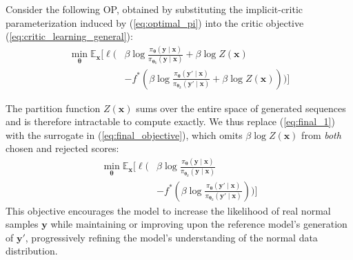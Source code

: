 \begin{proposition} \label{prop:surrogate}
Consider the following OP, obtained by substituting the implicit-critic parameterization induced by (\ref{eq:optimal_pi}) into the critic objective (\ref{eq:critic_learning_general}):
\begin{equation}
\label{eq:final_1}
\begin{split}
\min_{\boldsymbol{\theta}} \mathbb{E}_{\boldsymbol{x}} \Bigg[ \ell \Bigg( & \beta\log\frac{\pi_{\boldsymbol{\theta}}(\boldsymbol{y}\mid \boldsymbol{x})}{\pi_{\boldsymbol{\theta}_{k}}(\boldsymbol{y}\mid \boldsymbol{x})} + \beta \log Z(\boldsymbol{x}) \\
& - f^{*}\left( \beta\log\frac{\pi_{\boldsymbol{\theta}}(\boldsymbol{y}'\mid \boldsymbol{x})}{\pi_{\boldsymbol{\theta}_{k}}(\boldsymbol{y}'\mid \boldsymbol{x})} + \beta \log Z(\boldsymbol{x}) \right) \Bigg) \Bigg]
\end{split}
\end{equation}
\end{proposition}

The partition function $Z(\boldsymbol{x})$ sums over the entire space of generated sequences and is therefore intractable to compute exactly. We thus replace (\ref{eq:final_1}) with the surrogate in (\ref{eq:final_objective}), which omits $\beta\log Z(\boldsymbol{x})$ from \emph{both} chosen and rejected scores:
\begin{equation}
\label{eq:final_objective}
\begin{split}
\min_{\boldsymbol{\theta}} \mathbb{E}_{\boldsymbol{x}}  \Bigg[ \ell \Bigg( &\beta\log\frac{\pi_{\boldsymbol{\theta}}(\boldsymbol{y}\mid \boldsymbol{x})}{\pi_{\boldsymbol{\theta}_{k}}(\boldsymbol{y}\mid \boldsymbol{x})} \\
& - f^{*}\left( \beta\log\frac{\pi_{\boldsymbol{\theta}}(\boldsymbol{y}'\mid \boldsymbol{x})}{\pi_{\boldsymbol{\theta}_{k}}(\boldsymbol{y}'\mid \boldsymbol{x})} \right) \Bigg) \Bigg]
\end{split}
\end{equation}
This objective encourages the model to increase the likelihood of real normal samples $\boldsymbol{y}$ while maintaining or improving upon the reference model's generation of $\boldsymbol{y}'$, progressively refining the model's understanding of the normal data distribution.

